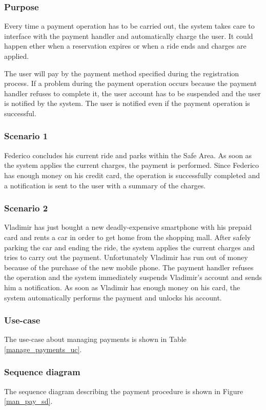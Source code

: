\subsubsection{Purpose}
Every time a payment operation has to be carried out, the system takes care to interface with the payment handler and automatically charge the user. It could happen ether when a reservation expires or when a ride ends and charges are applied.

The user will pay by the payment method specified during the registration process. If a problem during the payment operation occurs because the payment handler refuses to complete it, the user account has to be suspended and the user is notified by the system. The user is notified even if the payment operation is successful.

\subsubsection{Scenario 1}
Federico concludes his current ride and parks within the Safe Area. As soon as the system applies the current charges, the payment is performed. Since Federico has enough money on his credit card, the operation is successfully completed and a notification is sent to the user with a summary of the charges.

\subsubsection{Scenario 2}
Vladimir has just bought a new deadly-expensive smartphone with his prepaid card and rents a car in order to get home from the shopping mall. After safely parking the car and ending the ride, the system applies the current charges and tries to carry out the payment. Unfortunately Vladimir has run out of money because of the purchase of the new mobile phone. The payment handler refuses the operation and the system immediately suspends Vladimir's account and sends him a notification. As soon as Vladimir has enough money on his card, the system automatically performs the payment and unlocks his account.

\subsubsection{Use-case}
The use-case about managing payments is shown in Table \ref{manage_payments_uc}.

\subsubsection{Sequence diagram}
The sequence diagram describing the payment procedure is shown in Figure \ref{man_pay_sd}.

